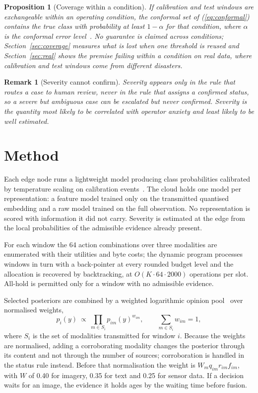 \documentclass[conference,a4paper]{IEEEtran}
\newif\ifsubmission
\newcommand{\masteronly}[1]{\ifsubmission\else#1\fi}
\newtheorem{proposition}{Proposition}
\newtheorem{remark}{Remark}
\begin{document}
\begin{proposition}[Coverage within a condition]\label{prop:coverage}
If calibration and test windows are exchangeable within an operating condition, the conformal set of (\ref{eq:conformal}) contains the true class with probability at least $1-\alpha$ for that condition, where $\alpha$ is the conformal error level~\cite{sadinle}. No guarantee is claimed across conditions; Section~\ref{sec:coverage} measures what is lost when one threshold is reused and Section~\ref{sec:real} shows the premise failing within a condition on real data, where calibration and test windows come from different disasters.
\end{proposition}

\begin{remark}[Severity cannot confirm]
Severity appears only in the rule that routes a case to human review, never in the rule that assigns a confirmed status, so a severe but ambiguous case can be escalated but never confirmed.\masteronly{ Severity is the quantity most likely to be correlated with operator anxiety and least likely to be well estimated.}
\end{remark}

\section{Method}
Each edge node runs a lightweight model producing class probabilities calibrated by temperature scaling on calibration events~\cite{guo2017}. The cloud holds one model per representation: a feature model trained only on the transmitted quantised embedding and a raw model trained on the full observation. No representation is scored with information it did not carry. Severity is estimated at the edge from the local probabilities of the admissible evidence already present.

For each window the 64 action combinations over three modalities are enumerated with their utilities and byte costs; the dynamic program processes windows in turn with a back-pointer at every rounded budget level and the allocation is recovered by backtracking, at $O(K\cdot 64\cdot 2000)$ operations per slot. All-hold is permitted only for a window with no admissible evidence.

Selected posteriors are combined by a weighted logarithmic opinion pool~\cite{heskes} over normalised weights,
\begin{equation}
\label{eq:pool}
p_i(y)\ \propto\ \prod_{m\in S_i} p_{im}(y)^{w_{im}},\qquad \sum_{m\in S_i} w_{im}=1,
\end{equation}
where $S_i$ is the set of modalities transmitted for window $i$. Because the weights are normalised, adding a corroborating modality changes the posterior through its content and not through the number of sources; corroboration is handled in the status rule instead. Before that normalisation the weight is $W_m q_{im} r_{im} f_{im}$, with $W$ of 0.40 for imagery, 0.35 for text and 0.25 for sensor data. If a decision waits for an image, the evidence it holds ages by the waiting time before fusion.
\end{document}
